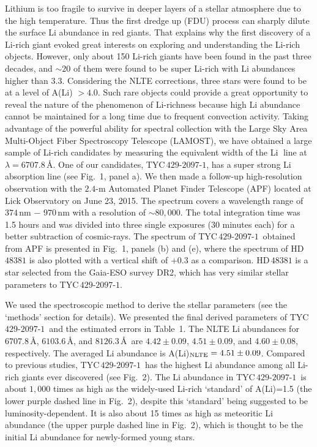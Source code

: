 \documentclass[twoside,onecolumnm,12pt]{article}
\newcommand{\upcite}[1]{\textsuperscript{\textsuperscript{\cite{#1}}}}
\newcommand{\starname}{TYC\,$429$-$2097$-$1$}
\newcommand\ion[2]{#1$\;${\scriptsize\rmfamily\uppercase\expandafter{\romannumeral#2}}\relax}
\begin{document}
\vspace{10pt}
Lithium is too fragile to survive in deeper layers of a stellar
atmosphere due to the high temperature. Thus the
first dredge up (FDU) process can sharply dilute the surface Li
abundance in red giants. That explains why the
first discovery\upcite{Wallerstein1982} of a Li-rich giant evoked
great interests on exploring and understanding the Li-rich objects.
However, only about 150 Li-rich giants have been
found\upcite{Brown1989, Monaco2011, Kirby2012, Martell2013,
Adamow2014, Casey2016} in the past three decades, and $\sim 20$ of
them were found to be super Li-rich with
Li abundances higher than 3.3. Considering the NLTE
corrections, three\upcite{Martell2013, Balachandran2000, Reddy2005}
stars were found to be at a level of A(Li) $>4.0$. Such rare objects
could provide a great opportunity to reveal the
nature of the phenomenon of Li-richness because high Li abundance
cannot be maintained for a long time due to frequent
convection activity.
Taking advantage of the powerful ability for spectral collection
with the Large Sky Area Multi-Object Fiber Spectroscopy Telescope
(LAMOST), we have obtained a large sample of
Li-rich candidates by measuring the equivalent
width of the \ion{Li}{1} line at $\lambda=6707.8$\,\AA. One of our
candidates, \starname, has a super strong Li
absorption line (see Fig.~1, panel a). We
then made a follow-up high-resolution observation
with the $2.4$-m Automated Planet Finder Telescope (APF) located at
Lick Observatory on June 23, 2015. The spectrum covers a wavelength
range of $374$\,nm $-$ $970$\,nm with a resolution
of $\sim80,000$. The total integration time was 1.5 hours and was 
divided into three single exposures (30 minutes
each) for a better subtraction of cosmic-rays. The spectrum of
\starname\ obtained from APF is presented in Fig.~1, panels
(b) and (e), where the spectrum of HD\,$48381$ is also plotted with
a vertical shift of $+0.3$ as a comparison. HD\,$48381$ is a star
selected from the Gaia-ESO survey DR2, 
which has very similar stellar parameters to \starname.



We used the spectroscopic method to derive the stellar parameters
(see the `methods' section for details). 
We presented the final derived parameters
of \starname\ and the estimated errors in Table~1. 
The NLTE Li abundances for $6707.8$\,\AA, $6103.6$\,\AA, 
and $8126.3$\,\AA\ are $4.42\pm0.09$, $4.51\pm0.09$,
and $4.60\pm0.08$, respectively. The averaged Li abundance is
A(Li)$_{\rm{NLTE}}=4.51\pm0.09$. Compared to
previous studies, \starname\ has the highest Li abundance among
all Li-rich giants ever discovered (see Fig.~2). 
The Li abundance in \starname\ is about
$1,000$ times as high as the widely-used Li-rich `standard' of
A(Li)=1.5 (the lower purple dashed line in Fig.~2), despite
this `standard' being suggested to be
luminosity-dependent\upcite{Kirby2016}. It is also about 15 times as
high as meteoritic Li abundance (the upper purple
dashed line in Fig.~2), which is thought to be the initial
Li abundance for newly-formed young stars.
\end{document}
